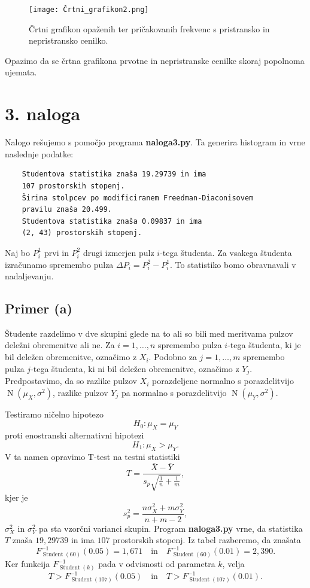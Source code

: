 \documentclass[a4paper,11pt]{article}
\DeclareMathOperator{\Student}{Student}
\DeclareMathOperator{\N}{N}
\begin{document}
\begin{figure}[H]
    \centering
    \texttt{[image: Črtni\_grafikon2.png]}
    \caption{Črtni grafikon opaženih ter pričakovanih frekvenc s pristransko in nepristransko cenilko.}
    \label{crtni_graf2}
\end{figure}
\noindent Opazimo da se črtna grafikona prvotne in nepristranske cenilke skoraj popolnoma ujemata.




\section*{3. naloga}

Nalogo rešujemo s pomočjo programa \textbf{naloga3.py}. 
Ta generira histogram in vrne naslednje podatke:
\begin{verbatim}
    Studentova statistika znaša 19.29739 in ima 
    107 prostorskih stopenj.
    Širina stolpcev po modificiranem Freedman-Diaconisovem
    pravilu znaša 20.499.
    Studentova statistika znaša 0.09837 in ima 
    (2, 43) prostorskih stopenj.
\end{verbatim}

Naj bo $P^1_i$ prvi in $P^2_i$ drugi izmerjen pulz $i$-tega študenta.
Za vsakega študenta izračunamo spremembo pulza $\Delta P_i = P^2_i - P^1_i$.
To statistiko bomo obravnavali v nadaljevanju.

\subsection*{Primer (a)}

Študente razdelimo v dve skupini glede na to ali so bili med meritvama pulzov deležni obremenitve ali ne.
Za $i = 1, \ldots, n$ spremembo pulza $i$-tega študenta, ki je bil deležen obremenitve, označimo z $X_i$. 
Podobno za $j = 1, \ldots, m$ spremembo pulza $j$-tega študenta, ki ni bil deležen obremenitve, označimo z $Y_j$.
Predpostavimo, da so razlike pulzov $X_i$ porazdeljene normalno s porazdelitvijo $\N(\mu_X, \sigma^2)$, 
razlike pulzov $Y_j$ pa normalno s porazdelitvijo $\N(\mu_Y, \sigma^2)$.

Testiramo ničelno hipotezo
\[H_0: \mu_X = \mu_Y\]
proti enostranski alternativni hipotezi
\[H_1: \mu_X > \mu_Y.\]
V ta namen opravimo T-test na testni statistiki
\[T = \frac{\bar{X}-\bar{Y}}{s_p \sqrt{\frac{1}{n}+\frac{1}{m}}},\]
kjer je 
\[s_p^2 = \frac{n\sigma^2_X + m\sigma^2_Y}{n+m-2},\]
$\sigma_X^2$ in $\sigma_Y^2$ pa sta vzorčni varianci skupin.
Program \textbf{naloga3.py} vrne, da statistika $T$ znaša $19{,}29739$ in ima $107$ prostorskih stopenj.
Iz tabel razberemo, da znašata 
\[F^{-1}_{\Student(60)}(0.05) = 1{,}671 \quad \text{in} \quad F^{-1}_{\Student(60)}(0.01) = 2{,}390.\]
Ker funkcija $F^{-1}_{\Student(k)}$ pada v odvisnosti od parametra $k$, velja
\[T > F^{-1}_{\Student(107)}(0.05) \quad \text{in} \quad T > F^{-1}_{\Student(107)}(0.01).\]
\end{document}
